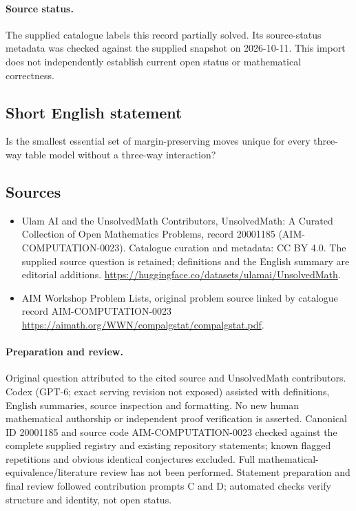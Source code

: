 \documentclass[11pt]{article}
\begin{document}
\paragraph{Source status.}
The supplied catalogue labels this record partially solved. Its source-status metadata was checked against the supplied snapshot on 2026-10-11. This import does not independently establish current open status or mathematical correctness.
\subsection{Short English statement}
Is the smallest essential set of margin-preserving moves unique for every three-way table model without a three-way interaction?
\subsection{Sources}
\begin{itemize}
\item[\hypertarget{source:20001185:1}{S1}] Ulam AI and the UnsolvedMath Contributors, UnsolvedMath: A Curated Collection of Open Mathematics Problems, record 20001185 (AIM-COMPUTATION-0023). Catalogue curation and metadata: CC BY 4.0. The supplied source question is retained; definitions and the English summary are editorial additions.
\url{https://huggingface.co/datasets/ulamai/UnsolvedMath}.
\item[\hypertarget{source:20001185:2}{S2}] AIM Workshop Problem Lists, original problem source linked by catalogue record AIM-COMPUTATION-0023
\url{https://aimath.org/WWN/compalgstat/compalgstat.pdf}.
\end{itemize}
\paragraph{Preparation and review.}
Original question attributed to the cited source and UnsolvedMath contributors. Codex (GPT-6; exact serving revision not exposed) assisted with definitions, English summaries, source inspection and formatting. No new human mathematical authorship or independent proof verification is asserted. Canonical ID 20001185 and source code AIM-COMPUTATION-0023 checked against the complete supplied registry and existing repository statements; known flagged repetitions and obvious identical conjectures excluded. Full mathematical-equivalence/literature review has not been performed. Statement preparation and final review followed contribution prompts C and D; automated checks verify structure and identity, not open status.
\label{end:20001185}
\end{document}
